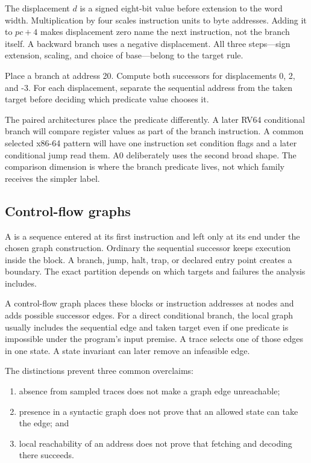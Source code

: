 The displacement \(d\) is a signed eight-bit value before extension to the
word width. Multiplication by four scales instruction units to byte addresses.
Adding it to \(pc+4\) makes displacement zero name the next instruction, not
the branch itself. A backward branch uses a negative displacement. All three
steps—sign extension, scaling, and choice of base—belong to the target rule.

\begin{tryit}[title={Taken, not taken, and backward}]
Place a branch at address 20. Compute both successors for displacements 0, 2,
and -3. For each displacement, separate the sequential address from the taken
target before deciding which predicate value chooses it.
\end{tryit}

The paired architectures place the predicate differently. A later RV64
conditional branch will compare register values as part of the branch
instruction. A common selected x86-64 pattern will have one instruction set
condition flags and a later conditional jump read them. A0 deliberately uses
the second broad shape. The comparison dimension is where the branch predicate
lives, not which family receives the simpler label.

\subsection{Control-flow graphs}

A  is a sequence entered at its first instruction and
left only at its end under the chosen graph construction. Ordinary
the sequential successor keeps execution inside the block. A branch, jump,
halt, trap, or
declared entry point creates a boundary. The exact partition depends on which
targets and failures the analysis includes.

A control-flow graph places these blocks or instruction addresses at nodes and
adds possible successor edges. For a direct conditional branch, the local
graph usually includes the sequential edge and taken target even if one predicate
is impossible under the program's input premise. A trace selects one of those
edges in one state. A state invariant can later remove an infeasible edge.

The distinctions prevent three common overclaims:

\begin{enumerate}
\item absence from sampled traces does not make a graph edge unreachable;
\item presence in a syntactic graph does not prove that an allowed state can
take the edge; and
\item local reachability of an address does not prove that fetching and
decoding there succeeds.
\end{enumerate}

